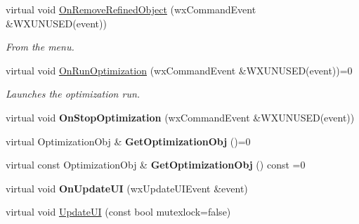 \begin{DoxyCompactItemize}
\mbox{\label{class_obj_cryst_1_1_w_x_optimization_obj_a13afb6da088e7406a5af2eb1c2f019f8}} 
virtual void \mbox{\hyperlink{class_obj_cryst_1_1_w_x_optimization_obj_a13afb6da088e7406a5af2eb1c2f019f8}{On\+Remove\+Refined\+Object}} (wx\+Command\+Event \&W\+X\+U\+N\+U\+S\+ED(event))
\begin{DoxyCompactList}\small\item\em From the menu. \end{DoxyCompactList}\item 
\mbox{\label{class_obj_cryst_1_1_w_x_optimization_obj_a2bb10adb92cdc1863e2d127a46d9e539}} 
virtual void \mbox{\hyperlink{class_obj_cryst_1_1_w_x_optimization_obj_a2bb10adb92cdc1863e2d127a46d9e539}{On\+Run\+Optimization}} (wx\+Command\+Event \&W\+X\+U\+N\+U\+S\+ED(event))=0
\begin{DoxyCompactList}\small\item\em Launches the optimization run. \end{DoxyCompactList}\item 
\mbox{\label{class_obj_cryst_1_1_w_x_optimization_obj_a1fd2009ab193d2575e2c958d0e530c8d}} 
virtual void {\bfseries On\+Stop\+Optimization} (wx\+Command\+Event \&W\+X\+U\+N\+U\+S\+ED(event))
\item 
\mbox{\label{class_obj_cryst_1_1_w_x_optimization_obj_a04ff5892f40615e1cc70468d1c280833}} 
virtual Optimization\+Obj \& {\bfseries Get\+Optimization\+Obj} ()=0
\item 
\mbox{\label{class_obj_cryst_1_1_w_x_optimization_obj_a4cc44f99a1ec15bdfa306764535ae5ee}} 
virtual const Optimization\+Obj \& {\bfseries Get\+Optimization\+Obj} () const =0
\item 
\mbox{\label{class_obj_cryst_1_1_w_x_optimization_obj_a2ea3690f9fdf06df99fcfbbb02140056}} 
virtual void {\bfseries On\+Update\+UI} (wx\+Update\+U\+I\+Event \&event)
\item 
virtual void \mbox{\hyperlink{class_obj_cryst_1_1_w_x_optimization_obj_a4643e15059bdd46e65c0ac18d7491787}{Update\+UI}} (const bool mutexlock=false)

\end{DoxyCompactItemize}
